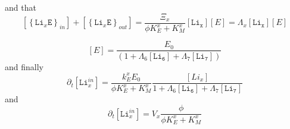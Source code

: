 \documentclass[aps,onecolumn]{revtex4}
\newcommand{\mychem}[1]{\mathtt{#1}}
\newcommand{\myconc}[1]{\left\lbrack{#1}\right\rbrack}
\newcommand{\LiEin}[1]{\myconc{\left\lbrace\mychem{Li}_{#1}\mychem{E}\right\rbrace_{in}}}
\newcommand{\LiEout}[1]{\myconc{\left\lbrace\mychem{Li}_{#1}\mychem{E}\right\rbrace_{out}}}
\begin{document}
and that
\begin{equation}
	\LiEin{x} + \LiEout{x} = \dfrac{ \Xi_x }{\phi K_E^x + K_M^x} \myconc{\mychem{Li_x}} \myconc{E} = \Lambda_x \myconc{\mychem{Li_x}} \myconc{E}
\end{equation}

\begin{equation}
	\myconc{E} = \dfrac{E_0}{\left(1+\Lambda_6 \myconc{\mychem{Li_6}} + \Lambda_7 \myconc{\mychem{Li_7}}\right)}
\end{equation}
and finally
\begin{equation}
	\partial_t \myconc{\mychem{Li}^{in}_x} = \dfrac{k_E^x E_0}{\phi K_E^x + K_M^x} \dfrac{\myconc{Li_x}}{1+\Lambda_6 \myconc{\mychem{Li_6}} + \Lambda_7 \myconc{\mychem{Li_7}}}
\end{equation}
and
\begin{equation}
	\partial_t \myconc{\mychem{Li}^{in}_x} = V_x \dfrac{\phi}{\phi K_E^x + K_M^x}
\end{equation}
\end{document}
